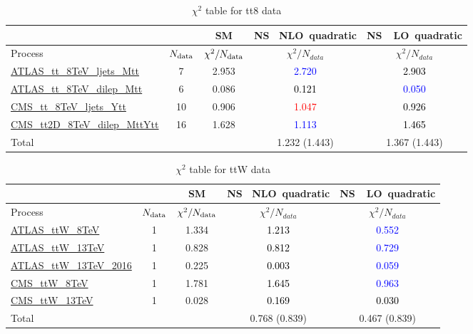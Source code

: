 \documentclass{article}
\begin{document}
\begin{table}[H]
\centering
\begin{tabular}{|l|c|c|c|c|}
\hline
 \multicolumn{2}{|c|}{} & SM& \rm NS \ NLO\ quadratic& \rm NS\ \ LO\ quadratic\\ \hline
Process & $N_{\rm data}$ & $\chi^ 2/N_{\rm data}$& $\chi^ 2/N_{data}$& $\chi^ 2/N_{data}$\\ \hline
\href{https://arxiv.org/abs/1511.04716}{ATLAS_tt_8TeV_ljets_Mtt} & 7 & 2.953 & \textcolor{blue}                            {2.720} & \textcolor{black}                            {2.903} \\ \hline
\href{https://arxiv.org/abs/1607.07281}{ATLAS_tt_8TeV_dilep_Mtt} & 6 & 0.086 & \textcolor{black}                            {0.121} & \textcolor{blue}                            {0.050} \\ \hline
\href{https://arxiv.org/abs/1505.04480}{CMS_tt_8TeV_ljets_Ytt} & 10 & 0.906 & \textcolor{red}                            {1.047} & \textcolor{black}                            {0.926} \\ \hline
\href{https://arxiv.org/abs/1703.01630}{CMS_tt2D_8TeV_dilep_MttYtt} & 16 & 1.628 & \textcolor{blue}                            {1.113} & \textcolor{black}                            {1.465} \\ \hline
\hline Total & &  & 1.232 (1.443) & 1.367 (1.443) \\ \hline
\end{tabular}
\caption{$\chi^2$ table for tt8 data}
\end{table}
\begin{table}[H]
\centering
\begin{tabular}{|l|c|c|c|c|}
\hline
 \multicolumn{2}{|c|}{} & SM& \rm NS \ NLO\ quadratic& \rm NS\ \ LO\ quadratic\\ \hline
Process & $N_{\rm data}$ & $\chi^ 2/N_{\rm data}$& $\chi^ 2/N_{data}$& $\chi^ 2/N_{data}$\\ \hline
\href{https://arxiv.org/abs/1509.05276}{ATLAS_ttW_8TeV} & 1 & 1.334 & \textcolor{black}                            {1.213} & \textcolor{blue}                            {0.552} \\ \hline
\href{https://arxiv.org/abs/1609.01599}{ATLAS_ttW_13TeV} & 1 & 0.828 & \textcolor{black}                            {0.812} & \textcolor{blue}                            {0.729} \\ \hline
\href{https://arxiv.org/abs/1901.03584}{ATLAS_ttW_13TeV_2016} & 1 & 0.225 & \textcolor{black}                            {0.003} & \textcolor{blue}                            {0.059} \\ \hline
\href{https://arxiv.org/abs/1510.01131}{CMS_ttW_8TeV} & 1 & 1.781 & \textcolor{black}                            {1.645} & \textcolor{blue}                            {0.963} \\ \hline
\href{https://arxiv.org/abs/1711.02547}{CMS_ttW_13TeV} & 1 & 0.028 & \textcolor{black}                            {0.169} & \textcolor{black}                            {0.030} \\ \hline
\hline Total & &  & 0.768 (0.839) & 0.467 (0.839) \\ \hline
\end{tabular}
\caption{$\chi^2$ table for ttW data}
\end{table}
\end{document}
